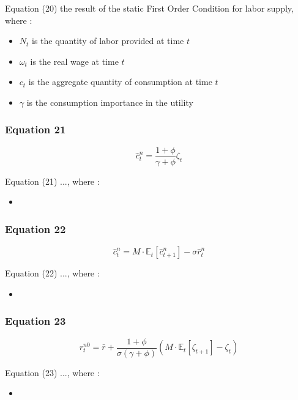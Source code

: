 \documentclass{article}
\begin{document}
Equation (20) the result of the static First Order Condition for labor supply, where : 
\begin{itemize}
    \item $N_{t}$ is the quantity of labor provided at time $t$
    \item $\omega_{t}$ is the real wage at time $t$
    \item $c_{t}$ is the aggregate quantity of consumption at time $t$
    \item $\gamma$ is the consumption importance in the utility
\end{itemize}

\subsubsection*{Equation 21}
\begin{equation}
    \hat{c}_{t}^{n}=\frac{1+\phi}{\gamma+\phi}\zeta_{t}
\end{equation}

Equation (21) ..., where : 
\begin{itemize}
    \item 
\end{itemize}

\subsubsection*{Equation 22}
\begin{equation}
    \hat{c}^{n}_{t} = M\cdot\mathbb{E}_{t}\left[\hat{c}^{n}_{t+1}\right]-\sigma\hat{r}^{n}_{t}
\end{equation}

Equation (22) ..., where : 
\begin{itemize}
    \item 
\end{itemize}

\subsubsection*{Equation 23}
\begin{equation}
    r^{n0}_{t}=\bar{r}+\frac{1+\phi}{\sigma(\gamma+\phi)}\left(M\cdot\mathbb{E}_{t}\left[\zeta_{t+1}\right]-\zeta_{t}\right)
\end{equation}

Equation (23) ..., where : 
\begin{itemize}
    \item 
\end{itemize}
\end{document}
